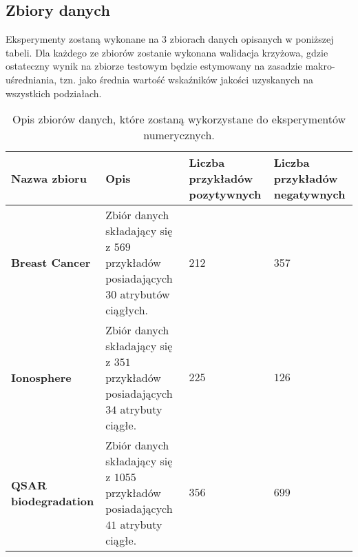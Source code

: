 \documentclass[
    left=2.5cm,         %
    right=2.5cm,        %
    top=2.5cm,          %
    bottom=3cm,         %
    bindingoffset=6mm,  %
    nohyphenation=false %
]{eiti/eiti-report}
\begin{document}
\subsection{Zbiory danych}
Eksperymenty zostaną wykonane na 3 zbiorach danych opisanych w poniższej tabeli. Dla każdego ze zbiorów zostanie wykonana walidacja krzyżowa, gdzie ostateczny wynik na zbiorze testowym będzie estymowany na zasadzie makro-uśredniania, tzn. jako średnia wartość wskaźników jakości uzyskanych na wszystkich podziałach.

\begin{table}[h]
\centering
\begin{tabular}{ |p{3cm}||p{6cm}|p{2cm}|p{2cm}|  }
    \hline
    \normalsize{Nazwa zbioru}& \normalsize{Opis} & \footnotesize{Liczba przykładów pozytywnych} & \footnotesize{Liczba przykładów negatywnych}\\
    \hline
     \textbf{Breast Cancer} \cite{datasetbreast} & Zbiór danych składający się z $569$ przykładów posiadających $30$ atrybutów ciągłych. & 212 & 357 \\
    \hline
     \textbf{Ionosphere}  \cite{datasetionosphere} & Zbiór danych składający się z $351$ przykładów posiadających $34$ atrybuty ciągłe. & $225$ & $126$\\
    \hline
     \textbf{QSAR biodegradation} \cite{datasetqsar} & Zbiór danych składający się z $1055$ przykładów posiadających $41$ atrybuty ciągłe. & $356$ &  $699$\\
    \hline
\end{tabular}
\caption{Opis zbiorów danych, które zostaną wykorzystane do eksperymentów numerycznych.}
\label{tab:my_label}
\end{table}


\clearpage
\printbibliography





\end{document}
